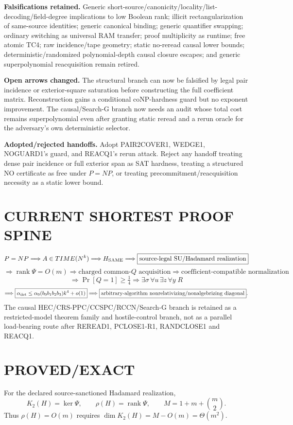 \documentclass[11pt]{article}
\begin{document}
\textbf{Falsifications retained.} Generic short-source/canonicity/locality/list-decoding/field-degree implications to low Boolean rank; illicit rectangularization of same-source identities; generic canonical binding; generic quantifier swapping; ordinary switching as universal RAM transfer; proof multiplicity as runtime; free atomic TC4; raw incidence/tape geometry; static no-reread causal lower bounds; deterministic/randomized polynomial-depth causal closure escapes; and generic superpolynomial reacquisition remain retired.

\textbf{Open arrows changed.} The structural branch can now be falsified by legal pair incidence or exterior-square saturation before constructing the full coefficient matrix. Reconstruction gains a conditional coNP-hardness guard but no exponent improvement. The causal/Search-G branch now needs an audit whose total cost remains superpolynomial even after granting static reread and a rerun oracle for the adversary's own deterministic selector.

\textbf{Adopted/rejected handoffs.} Adopt PAIR2COVER1, WEDGE1, NOGUARD1's guard, and REACQ1's rerun attack. Reject any handoff treating dense pair incidence or full exterior span as SAT hardness, treating a structured NO certificate as free under \(P=NP\), or treating precommitment/reacquisition necessity as a static lower bound.

\section*{CURRENT SHORTEST PROOF SPINE}
\[
P=NP\Longrightarrow A\in TIME(N^k)\Longrightarrow H_{\rm SAME}
\Longrightarrow \boxed{\text{source-legal SU/Hadamard realization}}
\]
\[
\Longrightarrow \boxed{\operatorname{rank}\Psi=O(m)}
\Longrightarrow \boxed{\text{charged common-}Q\text{ acquisition}}
\Longrightarrow \boxed{\text{coefficient-compatible normalization}}
\]
\[
\Longrightarrow \Pr[Q=1]\ge\tfrac14
\Longrightarrow \boxed{\exists\sigma\,\forall u\,\exists z\,\forall y\;R}
\]
\[
\Longrightarrow
\boxed{\alpha_{\rm det}\le\alpha_0(b_0b_1b_2b_3)k^4+o(1)}
\Longrightarrow
\boxed{\text{arbitrary-algorithm nonrelativizing/nonalgebrizing diagonal}}.
\]
The causal HEC/CRS-PPC/CCSPC/RCCN/Search-G branch is retained as a restricted-model theorem family and hostile-control branch, not as a parallel load-bearing route after REREAD1, PCLOSE1-R1, RANDCLOSE1 and REACQ1.

\section*{PROVED/EXACT}
For the declared source-sanctioned Hadamard realization,
\[
K_2(H)=\ker\Psi,\qquad \rho(H)=\operatorname{rank}\Psi,\qquad M=1+m+\binom m2.
\]
Thus \(\rho(H)=O(m)\) requires \(\dim K_2(H)=M-O(m)=\Theta(m^2)\).
\end{document}
